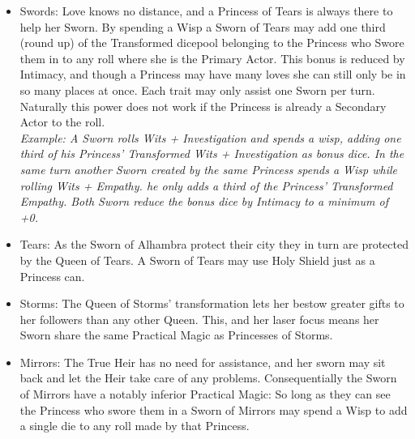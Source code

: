 \begin{itemize}
\item Swords: Love knows no distance, and a Princess of Tears is always there to help her Sworn. By spending a Wisp a Sworn of Tears may add one third (round up) of the Transformed dicepool belonging to the Princess who Swore them in to any roll where she is the Primary Actor. This bonus is reduced by Intimacy, and though a Princess may have many loves she can still only be in so many places at once. Each trait may only assist one Sworn per turn. Naturally this power does not work if the Princess is already a Secondary Actor to the roll. \\ \textit{Example: A Sworn rolls Wits + Investigation and spends a wisp, adding one third of his Princess' Transformed Wits + Investigation as bonus dice. In the same turn another Sworn created by the same Princess spends a Wisp while rolling Wits + Empathy. he only adds a third of the Princess' Transformed Empathy. Both Sworn reduce the bonus dice by Intimacy to a minimum of +0.}
\item Tears:  As the Sworn of Alhambra protect their city they in turn are protected by the Queen of Tears. A Sworn of Tears may use Holy Shield just as a Princess can. 
\item Storms: The Queen of Storms' transformation lets her bestow greater gifts to her followers than any other Queen. This, and her laser focus means her Sworn share the same Practical Magic as Princesses of Storms. 
\item Mirrors:  The True Heir has no need for assistance, and her sworn may sit back and let the Heir take care of any problems. Consequentially the Sworn of Mirrors have a notably inferior Practical Magic: So long as they can see the Princess who swore them in a Sworn of Mirrors may spend a Wisp to add a single die to any roll made by that Princess.
\end{itemize}



